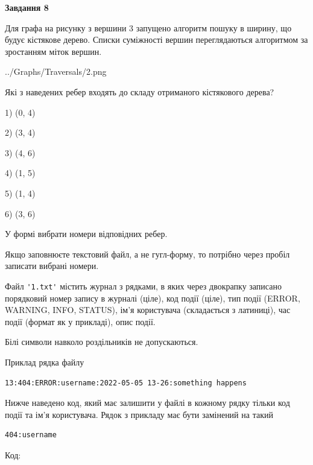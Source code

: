\documentclass[12pt, ukrainian]{article}
\def\code#1{\Verb!#1!}
\begin{document}
{\begin {large}
{\begin {center}\textbf{Завдання 8}\end {center}}\par
Для графа на рисунку з вершини 3 запущено алгоритм пошуку в ширину, що будує кістякове дерево. Списки суміжності вершин переглядаються алгоритмом за зростанням міток вершин.\par
\begin{center}
	{../Graphs/Traversals/2.png}
\end{center}
\par Які з наведених ребер входять до складу отриманого кістякового дерева?\par
1) (0, 4)\par
2) (3, 4)\par
3) (4, 6)\par
4) (1, 5)\par
5) (1, 4)\par
6) (3, 6)\par
{\vskip 15pt} У формі вибрати номери відповідних ребер.


Якщо заповнюєте текстовий файл, а не гугл-форму, то потрібно через пробіл записа\-ти вибрані номери.\par
\newpage


Файл \code{'1.txt'} містить журнал з рядками, в яких через двокрапку записано поряд\-ко\-вий номер запису в журналі (ціле), код події (ціле), тип події (ERROR, \\WARNING, INFO, STATUS), ім'я користувача (складається з латиниці), час події (фор\-мат як у прикладі), опис події.

Білі символи навколо роздільників не допускаються.

Приклад рядка файлу



\begin{verbatim}
13:404:ERROR:username:2022-05-05 13-26:something happens
\end{verbatim}


Нижче наведено код, який має залишити у файлі в кожному рядку тільки код події та ім'я користувача. Рядок з прикладу має бути замінений на такий



\begin{verbatim}
404:username
\end{verbatim}




Код:




\end{large}}
\end{document}

